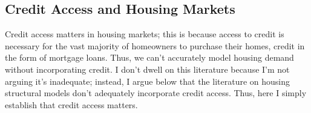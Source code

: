 \documentclass{article}[11pt]
\begin{document}
\begin{comment}
The empirical analyses I discuss above were largely limited by the lack of a comprehensive dataset on zoning restrictions and housing policy in general; since the publication of his 2005 paper with co-authors, Gyourko has compiled two waves of a nation-wide survey on local regulatory environments, one in 2007 and the other in 2021. \citep{gyourko2008new} \citep{gyourko2021local} To summarize, Gyourko and his co-authors sought data on 1) general characteristics of the regulatory process, 2) specifics of the local residential land use regulation, 3) outcomes of the regulatory process, 4) state-level analyses of land use policy actions, and 5) measures related to environmental and open space-related ballot initiatives (the latter two categories of variables weren't directly part of the survey but were supplemented by the authors' own analysis. Another prominent survey, the Terner California Residential Land Use Survey, focuses on California--although it has the drawback of only having one wave of data, from 2017-2018. \citep{mawhorter2018terner} In general, data has lagged behind formal modeling as it relates to housing supply exclusionary zoning -- \textit{particularly along the dimension of time}. \citep{gyourko2015regulation} Nonetheless, extensive progress has been made in data for urban and regional economics the last 10 years. \citep{newdata} With regard to historical data, much of this work has been made by digitizing paper maps (to obtain census tract- or neighborhood-level boundaries used to geographically categorize households, that we could pull from historical Census records, the complete microdata of which is released 72 years after it was fielded). These historical maps and linked census data have allowed researchers to track historical neighborhood formation and segregation within cities.}
\end{comment}

	\subsection{Credit Access and Housing Markets}
Credit access matters in housing markets; this is because access to credit is necessary for the vast majority of homeowners to purchase their homes, credit in the form of mortgage loans. Thus, we can't accurately model housing demand without incorporating credit. I don't dwell on this literature because I'm not arguing it's inadequate; instead, I argue below that the literature on housing structural models don't adequately incorporate credit access. Thus, here I simply establish that credit access matters.
\end{document}
